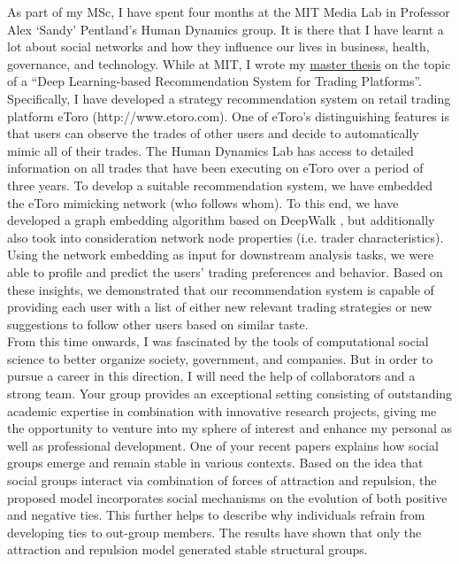 As part of my MSc, I have spent four months at the MIT Media Lab in Professor Alex `Sandy' Pentland's Human Dynamics group. 
It is there that I have learnt a lot about social networks and how they influence our lives in business, health, governance, and technology.
While at MIT, I wrote my \href{https://www.dropbox.com/s/1t0fl1v2jmpsrrx/MasterThesis_TobiasClement_12%3A13%3A2019.pdf?dl=0}{master thesis} on the topic of a ``Deep Learning-based Recommendation System for Trading Platforms''. 
Specifically, I have developed a strategy recommendation system on retail trading platform eToro (http://www.etoro.com).
One of eToro's distinguishing features is that users can observe the trades of other users and decide to automatically mimic all of their trades.
The Human Dynamics Lab has access to detailed information on all trades that have been executing on eToro over a period of three years. 
To develop a suitable recommendation system, we have embedded the eToro mimicking network (who follows whom). 
To this end, we have developed a graph embedding algorithm based on DeepWalk \cite{perozzi2014deepwalk}, but additionally also took into consideration network node properties (i.e. trader characteristics). 
Using the network embedding as input for downstream analysis tasks, we were able to profile and predict the users' trading preferences and behavior. 
Based on these insights, we demonstrated that our recommendation system is capable of providing each user with a list of either new relevant trading strategies or new suggestions to follow other users based on similar taste.\\

From this time onwards, I was fascinated by the tools of computational social science to better organize society, government, and companies. 
But in order to pursue a career in this direction, I will need the help of collaborators and a strong team. 
Your group provides an exceptional setting consisting of outstanding academic expertise in combination with innovative research projects, giving me the opportunity to venture into my sphere of interest and enhance my personal as well as professional development.
One of your recent papers \cite{stadtfeld2020emergence} explains how social groups emerge and remain stable in various contexts.
Based on the idea that social groups interact via combination of forces of attraction and repulsion, the proposed model incorporates social mechanisms on the evolution of both positive and negative ties.
This further helps to describe why individuals refrain from developing ties to out-group members.
The results have shown that only the attraction and repulsion model generated stable structural groups.

